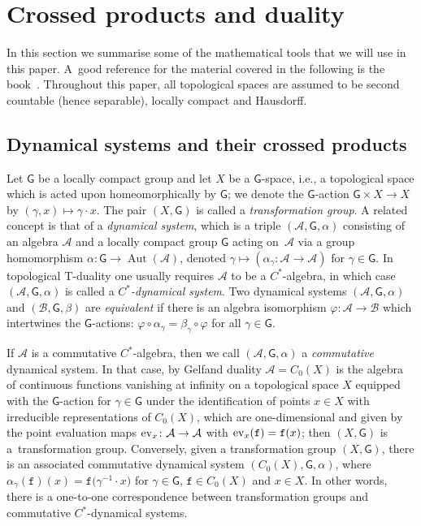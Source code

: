 \documentclass[10pt,a4paper]{amsart}
\numberwithin{equation}{section}
\newcommand{\sfG}{\mathsf{G}}
\newcommand{\Aut}{\operatorname{Aut}}
\def\alg{{\mathcal A}}
\def\balg{{\mathcal B}}
\begin{document}
\section{Crossed products and duality\label{sec:NAdef}}

In this section we summarise some of the mathematical tools that we
will use in this paper. A~good reference for the material covered in
the following is the book~\cite{Williams2007}. Throughout this paper,
all topological spaces are assumed to be second countable (hence
separable), locally compact and Hausdorff.

\subsection{Dynamical systems and their crossed products}

Let $\sfG$ be a locally compact group and let $X$ be a $\sfG$-space, i.e., a
topological space which is acted
upon
homeomorphically by $\sfG$; we denote the $\sfG$-action $\sfG\times
X\to X$ by $(\gamma,x)\mapsto\gamma\cdot x$. The pair $(X,\sfG)$ is
called a \emph{transformation group}.
 A related concept is that of a
\emph{dynamical system}, which is a triple $(\alg,\sfG,\alpha)$
consisting of an algebra $\alg$ and a locally compact group $\sfG$ acting
on~$\alg$ via a group homomorphism $\alpha\colon \sfG\to\Aut (\alg)$,
denoted $\gamma\mapsto(\alpha_\gamma\colon \alg\to\alg)$ for $\gamma\in
\sfG$. In topological
T-duality one usually requires $\alg$ to be a $C^*$-algebra, in which
case $(\alg,\sfG,\alpha)$ is called a \emph{$C^*$-dynamical
 system}. Two dynamical systems $(\alg,\sfG,\alpha)$ and $(\balg,\sfG,\beta)$ are
\emph{equivalent} if there is an algebra isomorphism
$\varphi\colon \alg\to\balg$ which intertwines the $\sfG$-actions: $\varphi\circ\alpha_\gamma =
\beta_\gamma\circ\varphi$ for all $\gamma\in \sfG$.

If $\alg$ is a commutative $C^*$-algebra, then we call $(\alg,\sfG,\alpha)$ a
\emph{commutative} dynamical system. In that case, by Gelfand duality
$\alg=C_0(X)$ is the algebra of continuous functions vanishing at
infinity on a
topological space $X$
equipped with the $\sfG$-action  for $\gamma\in \sfG$ under
the identification of points $x\in X$ with irreducible representations
of $C_0(X)$, which are one-dimensional and given by the point evaluation
maps ${\rm ev}_x\colon \alg\to\alg$ with ${\rm ev}_x(\mathtt{f})=\mathtt{f}(x)$; then
$(X,\sfG)$ is a~transformation group. Conversely, given a transformation
group $(X,\sfG)$, there is an associated commutative dynamical system
$(C_0(X), \sfG,\alpha)$, where $\alpha_\gamma(\mathtt{f})(x)=\mathtt{f}\big(\gamma^{-1}\cdot x\big)$ for $\gamma\in
\sfG$, $\mathtt{f}\in C_0(X)$ and $x\in X$. In other words, there is a one-to-one
correspondence between transformation groups and commutative $C^*$-dynamical
systems.
\end{document}
